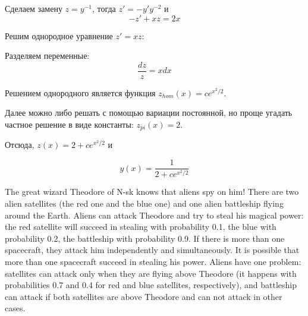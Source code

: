 \documentclass[addpoints]{exam} %
\begin{document}
\begin{questions}
\begin{solution}
Сделаем замену $z=y^{-1}$, тогда $z'=-y'y^{-2}$ и
\[
-z'+xz=2x
\]

Решим однородное уравнение $z'=xz$:

Разделяем переменные:
\[
\frac{dz}{z}=xdx
\]

Решением однородного является функция $z_{hom}(x)=c e^{x^2/2}$.

Далее можно либо решать с помощью вариации постоянной, но проще угадать частное решение в виде константы: $z_{pi}(x)=2$.

Отсюда, $z(x)=2+c e^{x^2/2}$ и

\[
y(x)=\frac{1}{2+c e^{x^2/2}}
\]

\end{solution}

\newpage

\question The great wizard Theodore of N-sk knows that aliens spy on him! There are two alien satellites (the red one and the blue one) and one alien battleship flying around the Earth. Aliens can attack Theodore and try to steal his magical power: the red satellite will succeed in stealing with probability 0.1, the blue with probability 0.2, the battleship with probability 0.9. If there is more than one spacecraft, they attack him independently and simultaneously. It is possible that more than one spacecraft succeed in stealing his power. Aliens have one problem: satellites can attack only when they are flying above Theodore (it happens with probabilities 0.7 and 0.4 for red and blue satellites, respectively), and battleship can attack if both satellites are above Theodore and can not attack in other cases.


\end{questions}
\end{document}
